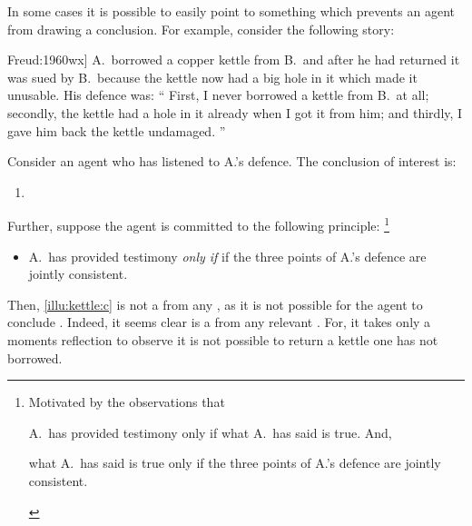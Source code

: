 \begin{note}
  In some cases it is possible to easily point to something which prevents an agent from drawing a conclusion.
  For example, consider the following story:

  \begin{scenario}[A copper kettle --- \cite[62]{Freud:1960wx}]%
    \label{illu:kettle}%
    A.\ borrowed a copper kettle from B.\ and after he had returned it was sued by B.\ because the kettle now had a big hole in it which made it unusable.
    His defence was:
    ``%
    First, I never borrowed a kettle from B.\ at all;
    secondly, the kettle had a hole in it already when I got it from him;
    and thirdly, I gave him back the kettle undamaged.%
    ''
  \end{scenario}

  \noindent%
  Consider an agent who has listened to A.'s defence.
  The conclusion of interest is:
  \begin{enumerate}[label=C\thescenarioCounter., ref=(C\thescenarioCounter)]
  \item
    \label{illu:kettle:c}
  \end{enumerate}
  Further, suppose the agent is committed to the following principle:%
  \footnote{
    Motivated by the observations that
    \begin{enumerate*}[label=(\alph*), ref=(\alph*)]
    \item A.\ has provided testimony only if what A.\ has said is true.
      And,
    \item what A.\ has said is true only if the three points of A.'s defence are jointly consistent.
    \end{enumerate*}
  }
  \begin{itemize}
  \item
    A.\ has provided testimony \emph{only if} if the three points of A.'s defence are jointly consistent.
  \end{itemize}
  Then, \ref{illu:kettle:c} is not a \fc{} from any \pool{}, as it is not possible for the agent to conclude .
  Indeed, it seems clear  is a \fc{} from any relevant \pool{}.
  For, it takes only a moments reflection to observe it is not possible to return a kettle one has not borrowed.
\end{note}

